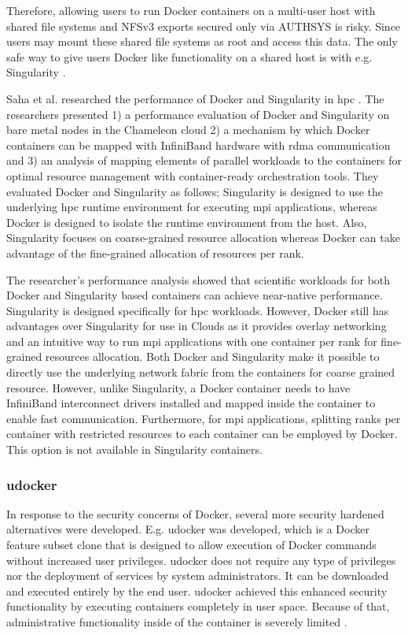\documentclass[12pt]{article}
\begin{document}
Therefore, allowing users to run Docker containers on a multi-user host with shared file systems and NFSv3 exports secured only via AUTHSYS is risky. Since users may mount these shared file systems as root and access this data. The only safe way to give users Docker like functionality on a shared host is with e.g. Singularity \cite{cloudy-hutch}.

Saha et al. researched the performance of Docker and Singularity in \gls{hpc} \cite{saha2018evaluation}. The researchers presented 1) a performance evaluation of Docker and Singularity on bare metal nodes in the Chameleon cloud 2) a mechanism by which Docker containers can be mapped with InfiniBand hardware with \gls{rdma} communication and 3) an analysis of mapping elements of parallel workloads to the containers for optimal resource management with container-ready orchestration tools. They evaluated Docker and Singularity as follows; Singularity is designed to use the underlying \gls{hpc} runtime environment for executing \gls{mpi} applications, whereas Docker is designed to isolate the runtime environment from the host. Also, Singularity focuses on coarse-grained resource allocation whereas Docker can take advantage of the fine-grained allocation of resources per rank.

The researcher's performance analysis showed that scientific workloads for both Docker and Singularity based containers can achieve near-native performance. Singularity is designed specifically for \gls{hpc} workloads. However, Docker still has advantages over Singularity for use in Clouds as it provides overlay networking and an intuitive way to run \gls{mpi} applications with one container per rank for fine-grained resources allocation. Both Docker and Singularity make it possible to directly use the underlying network fabric from the containers for coarse grained resource. However, unlike Singularity, a Docker container needs to have InfiniBand interconnect drivers installed and mapped inside the container to enable fast communication. Furthermore, for \gls{mpi} applications, splitting ranks per container with restricted resources to each container can be employed by Docker. This option is not available in Singularity containers.


\subsubsection{udocker}
In response to the security concerns of Docker, several more security hardened alternatives were developed. E.g. udocker was developed, which is a Docker feature subset clone that is designed to allow execution of Docker commands without increased user privileges. udocker does not require any type of privileges nor the deployment of services by system administrators. It can be downloaded and executed entirely by the end user. udocker achieved this enhanced security functionality by executing containers completely in user space. Because of that, administrative functionality inside of the container is severely limited \cite{utah-udocker}.
\end{document}
